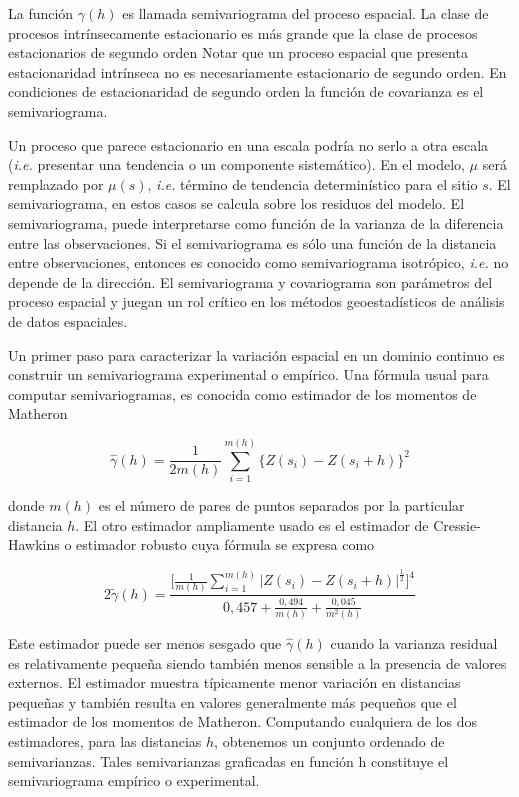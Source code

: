 \documentclass[11pt,b5paper,]{krantz}
\begin{document}
La función \(\gamma(h)\) es llamada semivariograma del proceso espacial.
La clase de procesos intrínsecamente estacionario es más grande que la
clase de procesos estacionarios de segundo orden Notar que un proceso
espacial que presenta estacionaridad intrínseca no es necesariamente
estacionario de segundo orden. En condiciones de estacionaridad de
segundo orden la función de covarianza es el semivariograma.

Un proceso que parece estacionario en una escala podría no serlo a otra
escala (\emph{i.e.} presentar una tendencia o un componente
sistemático). En el modelo, \(\mu\) será remplazado por \(\mu(s)\),
\emph{i.e.} término de tendencia determinístico para el sitio \(s\). El
semivariograma, en estos casos se calcula sobre los residuos del modelo.
El semivariograma, puede interpretarse como función de la varianza de la
diferencia entre las observaciones. Si el semivariograma es sólo una
función de la distancia entre observaciones, entonces es conocido como
semivariograma isotrópico, \emph{i.e.} no depende de la dirección. El
semivariograma y covariograma son parámetros del proceso espacial y
juegan un rol crítico en los métodos geoestadísticos de análisis de
datos espaciales.

Un primer paso para caracterizar la variación espacial en un dominio
continuo es construir un semivariograma experimental o empírico. Una
fórmula usual para computar semivariogramas, es conocida como estimador
de los momentos de Matheron

\[\hat{\gamma}(h)=\frac{1}{2 m (h)}\sum_{i=1}^{m(h)} \Big\{Z(s_i)-Z(s_i+h) \Big\}^2\]

donde \(m(h)\) es el número de pares de puntos separados por la
particular distancia \(h\). El otro estimador ampliamente usado es el
estimador de Cressie- Hawkins o estimador robusto cuya fórmula se
expresa como

\[2 \widetilde{\gamma}(h)= \frac{\Big[ \frac{1}{m(h)} \sum_{i=1}^{m(h)} \Big| Z(s_i) - Z(s_i + h) \Big| ^\frac{1}{2}  \Big] ^4}{0,457 + \frac{0,494}{m(h)} + \frac{0,045}{m^2(h)}}\]

Este estimador puede ser menos sesgado que \(\hat{\gamma}(h)\) cuando la
varianza residual es relativamente pequeña siendo también menos sensible
a la presencia de valores externos. El estimador muestra típicamente
menor variación en distancias pequeñas y también resulta en valores
generalmente más pequeños que el estimador de los momentos de Matheron.
Computando cualquiera de los dos estimadores, para las distancias \(h\),
obtenemos un conjunto ordenado de semivarianzas. Tales semivarianzas
graficadas en función h constituye el semivariograma empírico o
experimental.
\end{document}
